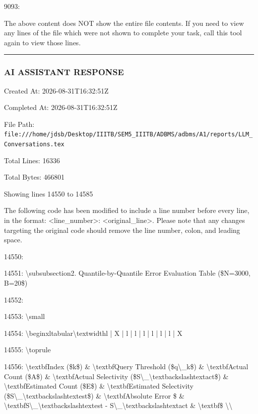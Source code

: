 \documentclass[11pt,a4paper]{article}
\begin{document}
9093:

The above content does NOT show the entire file contents. If you need to view any lines of the file which were not shown to complete your task, call this tool again to view those lines.


\hrule

\subsubsection{AI ASSISTANT RESPONSE}

Created At: 2026-08-31T16:32:51Z

Completed At: 2026-08-31T16:32:51Z

File Path: \texttt{file:///home/jdsb/Desktop/IIITB/SEM5\_IIITB/ADBMS/adbms/A1/reports/LLM\_Conversations.tex}

Total Lines: 16336

Total Bytes: 466801

Showing lines 14550 to 14585

The following code has been modified to include a line number before every line, in the format: <line\_number>: <original\_line>. Please note that any changes targeting the original code should remove the line number, colon, and leading space.

14550:

14551: \textbackslash{}subsubsection{2. Quantile-by-Quantile Error Evaluation Table (\$N=3000, B=20\$)}

14552:

14553: \textbackslash{}small

14554: \textbackslash{}begin{xltabular}{\textbackslash{}textwidth}{l | X | l | l | l | l | l | l | X}

14555: \textbackslash{}toprule

14556: \textbackslash{}textbf{Index (\$k\$)} \& \textbackslash{}textbf{Query Threshold (\$q\textbackslash{}\_k\$)} \& \textbackslash{}textbf{Actual Count (\$A\$)} \& \textbackslash{}textbf{Actual Selectivity (\$S\textbackslash{}\_{\textbackslash{}textbackslash{}text{act}}\$)} \& \textbackslash{}textbf{Estimated Count (\$E\$)} \& \textbackslash{}textbf{Estimated Selectivity (\$S\textbackslash{}\_{\textbackslash{}textbackslash{}text{est}}\$)} \& \textbackslash{}textbf{Absolute Error \$} \& \textbackslash{}textbf{S\textbackslash{}\_{\textbackslash{}textbackslash{}text{est}} - S\textbackslash{}\_{\textbackslash{}textbackslash{}text{act}}} \& \textbackslash{}textbf{\$} \textbackslash{}\textbackslash{}
\end{document}
